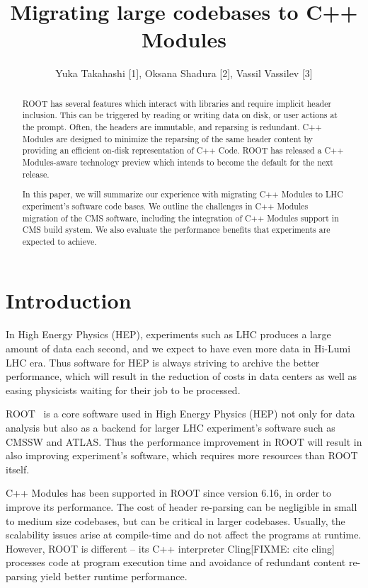 \documentclass[12pt]{iopart}
\begin{document}
\title{Migrating large codebases to C++ Modules}

\author{Yuka Takahashi [1], Oksana Shadura [2], Vassil Vassilev [3]}
\address{[1] University of Tokyo, [2] University of Nebraska-Lincoln, [3] Princeton University}

\begin{abstract}
ROOT has several features which interact with libraries and require implicit header inclusion. This can be triggered by reading or writing data on disk, or user actions at the prompt. Often, the headers are immutable, and reparsing is redundant. C++ Modules are designed to minimize the reparsing of the same header content by providing an efficient on-disk representation of C++ Code. ROOT has released a C++ Modules-aware technology preview which intends to become the default for the next release.

In this paper, we will summarize our experience with migrating C++ Modules to LHC experiment's software code bases. We outline the challenges in C++ Modules migration of the CMS software, including the integration of C++ Modules support in CMS build system. We also evaluate the performance benefits that experiments are expected to achieve.
\end{abstract}

\section{Introduction}
\label{intro}

In High Energy Physics (HEP), experiments such as LHC \cite{lhc} produces a large amount of data each second, and we expect to have even more data in Hi-Lumi LHC \cite{hilumi} era. Thus software for HEP is always striving to archive the better performance, which will result in the reduction of costs in data centers as well as easing physicists waiting for their job to be processed.

ROOT~\cite{root} is a core software used in High Energy Physics (HEP) not only for data analysis but also as a backend for larger LHC experiment's software such as CMSSW and ATLAS. Thus the performance improvement in ROOT will result in also improving experiment's software, which requires more resources than ROOT itself.

C++ Modules \cite{vassil-paper} has been supported in ROOT since version 6.16, in order to improve its performance. The cost of header re-parsing can be negligible in small to medium size codebases, but can be critical in larger codebases. Usually, the scalability issues arise at compile-time and do not affect the programs at runtime. However, ROOT is different -- its C++ interpreter Cling[FIXME: cite cling] processes code at program execution time and avoidance of redundant content re-parsing yield better runtime performance.
\end{document}

